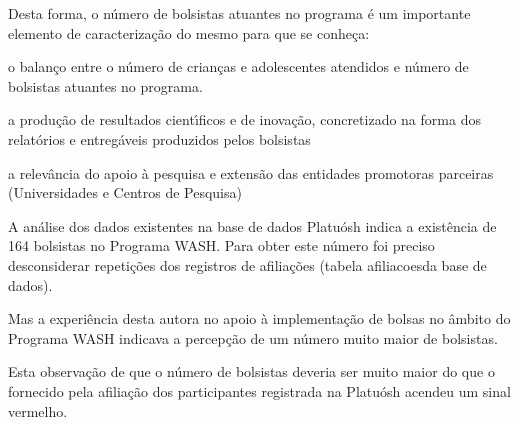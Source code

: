 \documentclass[
12pt,		%
openright,	%
twoside,  %
a4paper,			%
chapter=TITLE,		%
english,			%
french,				%
spanish,			%
brazil				%
]{USPSC-classe/USPSC}
\begin{document}
Desta forma, o n\'umero de bolsistas atuantes no programa \'e um importante elemento de caracteriza\c{c}\~ao do mesmo para que se conhe\c{c}a:


















\begin{alineas}
\item o balan\c{c}o entre o n\'umero de crian\c{c}as e adolescentes atendidos e n\'umero de  bolsistas atuantes no programa.
\item a produ\c{c}\~ao de resultados cient\'{\i}ficos e de inova\c{c}\~ao, concretizado na forma dos relat\'orios  e entreg\'aveis produzidos pelos bolsistas
\item a relev\^ancia do apoio \`a pesquisa e extens\~ao das entidades promotoras parceiras (Universidades e Centros de Pesquisa)
\end{alineas}

A an\'alise dos dados existentes na base de dados Platu\'osh indica a exist\^encia de 164 bolsistas no Programa WASH. Para obter este n\'umero foi preciso desconsiderar repeti\c{c}\~oes dos registros de afilia\c{c}\~oes (tabela \textquotedbl afiliacoes\textquotedbl  da base de dados).

















Mas a experi\^encia desta autora no apoio \`a implementa\c{c}\~ao de bolsas no \^ambito do Programa WASH indicava a percep\c{c}\~ao de um n\'umero muito maior de bolsistas.

















Esta observa\c{c}\~ao de que o n\'umero de bolsistas deveria ser muito maior do que o fornecido pela afilia\c{c}\~ao dos participantes registrada na Platu\'osh acendeu um sinal vermelho.
\end{document}
